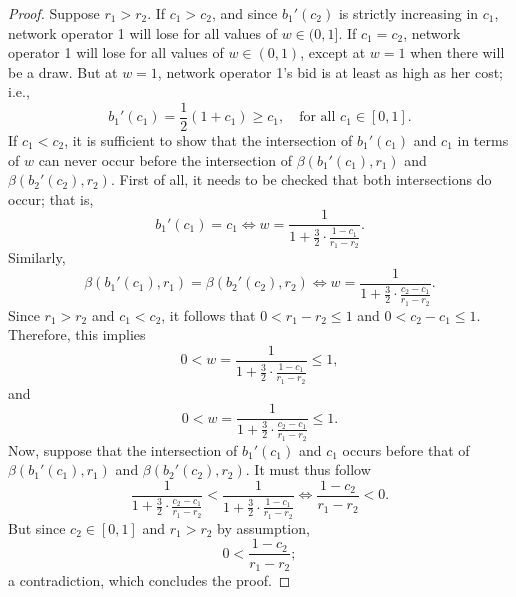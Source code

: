\begin{proof}
Suppose $r_1>r_2$. If $c_1>c_2$, and since $b_1'(c_2)$ is strictly increasing in $c_1$, network operator 1 will lose for all values of $w\in(0,1]$. If $c_1=c_2$, network operator 1 will lose for all values of $w\in(0,1)$, except at $w=1$ when there will be a draw. But at $w=1$, network operator 1's bid is at least as high as her cost; i.e.,
\begin{equation}
	b_1'(c_1) = \frac{1}{2}(1+c_1) \ge c_1, \quad\text{for all } c_1\in[0,1].
\end{equation}
If $c_1<c_2$, it is sufficient to show that the intersection of $b_1'(c_1)$ and $c_1$ in terms of $w$ can never occur before the intersection of $\beta(b_1'(c_1),r_1)$ and $\beta(b_2'(c_2),r_2)$. First of all, it needs to be checked that both intersections do occur; that is,
\begin{equation}
	b_1'(c_1) = c_1 \iff w = \frac{1}{1 + \frac{3}{2}\cdot\frac{1 - c_1}{r_1 - r_2}}.
\end{equation}
Similarly,
\begin{equation}
	\beta(b_1'(c_1),r_1) = \beta(b_2'(c_2),r_2) \iff w = \frac{1}{1+ \frac{3}{2}\cdot\frac{c_2-c_1}{r_1-r_2}}.
\end{equation}
Since $r_1>r_2$ and $c_1<c_2$, it follows that $0<r_1-r_2\le 1$ and $0<c_2-c_1\le 1$. Therefore, this implies
\begin{equation}
	0 < w = \frac{1}{1+ \frac{3}{2}\cdot\frac{1-c_1}{r_1-r_2}} \le 1,
\end{equation}
and
\begin{equation}
	0 < w = \frac{1}{1+ \frac{3}{2}\cdot\frac{c_2-c_1}{r_1-r_2}} \le 1.
\end{equation}
Now, suppose that the intersection of $b_1'(c_1)$ and $c_1$ occurs before that of $\beta(b_1'(c_1),r_1)$ and $\beta(b_2'(c_2),r_2)$. It must thus follow
\begin{equation}
	\frac{1}{1+\frac{3}{2}\cdot\frac{c_2-c_1}{r_1-r_2}} < \frac{1}{1+\frac{3}{2}\cdot\frac{1-c_1}{r_1-r_2}} \iff \frac{1-c_2}{r_1-r_2} < 0.
\end{equation}
But since $c_2\in[0,1]$ and $r_1>r_2$ by assumption,
\begin{equation}
	0 < \frac{1-c_2}{r_1-r_2};
\end{equation}
a contradiction, which concludes the proof.
\end{proof}

